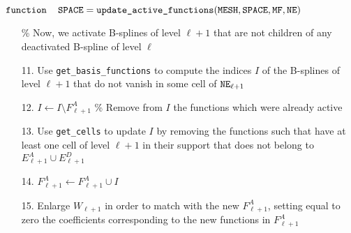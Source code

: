 \documentclass[12pt,a4paper,pdftex]{article}
\theoremstyle{plain}
\theoremstyle{definition}
\theoremstyle{remark}
\DeclareMathOperator\mesh{\texttt{MESH}}
\DeclareMathOperator\basis{\texttt{SPACE}}
\DeclareMathOperator\newcells{\tt NE}
\DeclareMathOperator\functionstoremove{\tt MF}
\begin{document}
\begin{algorithm}[H]{$\texttt{function}\quad \basis = \texttt{update\_active\_functions}(\mesh,\basis,\functionstoremove,\newcells)$\;}
{\begin{minipage}{.95\textwidth}
{\begin{enumerate}
{\begin{enumerate}
{\begin{enumerate}
 \end{enumerate}
}
\item[]\% Now, we activate B-splines of level $\ell+1$ that are not children of any deactivated B-spline of level $\ell$\;
\item[11.] Use \texttt{get\_basis\_functions} to compute the indices $I$ of the B-splines of level $\ell+1$ that do not vanish in some cell of $\newcells_{\ell+1}$\;
\item[12.] $I\leftarrow I\setminus F^A_{\ell+1}$ \% Remove from $I$ the functions which were already active\;
\item[13.] Use \texttt{get\_cells} to update $I$ by removing the functions such that have at least one cell of level $\ell+1$ in their support that does not belong to $E^A_{\ell+1}\cup E^D_{\ell+1}$\;
\item[14.] $F^A_{\ell+1}\leftarrow F^A_{\ell+1}\cup I$\;
\item [15.] Enlarge $W_{\ell+1}$ in order to match with the new $F^A_{\ell+1}$, setting equal to zero the coefficients corresponding to the new functions in $F^A_{\ell+1}$\;
\end{enumerate}
}
\end{enumerate}
\medskip
}%
\end{minipage}
}
\end{algorithm}


\newpage
\end{document}
